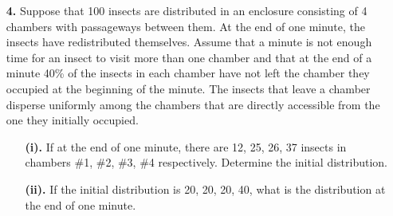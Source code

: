 \documentclass[ 12pt ]{article}
\begin{document}
\begin{enumerate}
\begin{proof}[Solution]
\begin{enumerate}
				$\left(\begin{smallmatrix} 0 \\ 3 \\ 7 \end{smallmatrix}\right)$ costs \$39. Clearly we can see that $\left(\begin{smallmatrix} 3 \\ 0 \\ 4 \end{smallmatrix}
				\right)$ is the least expensive option.
		\end{enumerate}
	\end{proof}


	\item[\textbf{4.}] Suppose that 100 insects are distributed in an enclosure consisting of 4 chambers with passageways between them. At the end of one minute, the
		insects have redistributed themselves. Assume that a minute is not enough time for an insect to visit more than one chamber and that at the end of a minute 40\%
		of the insects in each chamber have not left the chamber they occupied at the beginning of the minute. The insects that leave a chamber disperse uniformly among
		the chambers that are directly accessible from the one they initially occupied.
		\begin{enumerate}
			\item[\textbf{(i).}] If at the end of one minute, there are 12, 25, 26, 37 insects in chambers \#1, \#2, \#3, \#4 respectively. Determine the initial distribution.
			\item[\textbf{(ii).}] If the initial distribution is 20, 20, 20, 40, what is the distribution at the end of one minute.
		\end{enumerate}


\end{enumerate}
\end{document}

